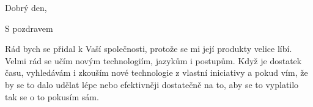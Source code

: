 \documentclass[11pt,a4paper,sans]{moderncv}        %
\begin{document}

\clearpage
\opening{Dobrý den,}
\closing{S pozdravem}
\date{}
\makelettertitle
Rád bych se přidal k Vaší společnosti, protože se mi její produkty velice líbí. Velmi rád se učím novým technologiím, jazykům i postupům. Když je dostatek času, vyhledávám i zkouším nové technologie z vlastní iniciativy a pokud vím, že by se to dalo udělat lépe nebo efektivněji dostatečně na to, aby se to vyplatilo tak se o to pokusím sám.

\makeletterclosing

\fi


\end{document}
